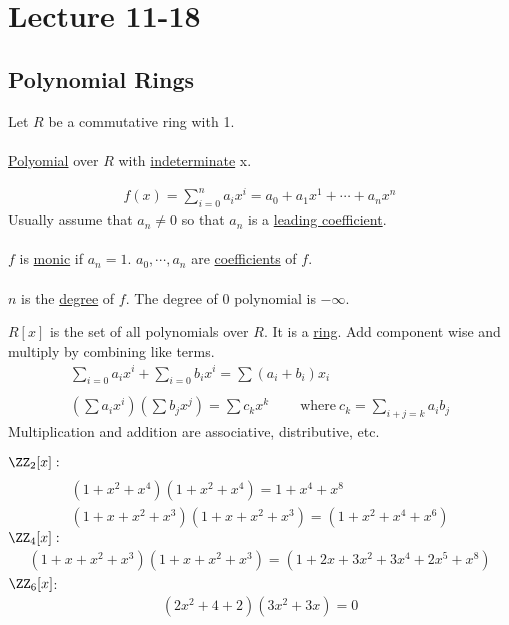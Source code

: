 \documentclass[class=scrartcl, crop=false]{standalone}
\date{2019-11-18}
\begin{document}
\section{Lecture 11-18}

\subsection{Polynomial Rings}

\begin{definition}
  Let $R$ be a commutative ring with 1. 
  \\\\
  \ul{Polyomial} over $R$ with \ul{indeterminate} x.

  \begin{gather*}
    f(x) = \sum_{i = 0}^{n}a_i x^i = a_0 + a_1 x^1 + \cdots + a_nx^n
  \end{gather*} 
  Usually assume that $a_n \neq 0$ so that $a_n$ is a \ul{leading coefficient}.
  \\\\
  $f$ is \ul{monic} if $a_n = 1$. $a_0, \cdots, a_n$ are \ul{coefficients} of $f$.
  \\\\
  $n$ is the \ul{degree} of $f$. The degree of $0$ polynomial is $-\infty$.
\end{definition} \noindent

$R[x]$ is the set of all polynomials over $R$. It is a \ul{ring}. Add component wise and multiply by combining like terms.
\begin{gather*}
  \sum_{i = 0}a_ix^i + \sum_{i = 0}b_ix^i = \sum(a_i + b_i)x_i 
  \\\\
  (\sum a_ix^i)(\sum b_j x^j) = \sum c_k x^k \qquad \ \text{where} \ c_k = \sum_{i + j = k}a_ib_j
\end{gather*} 
Multiplication and addition are associative, distributive, etc.

\begin{example}
  $\ZZ_2[x]:$
  \begin{gather*}
    \\
    (1 + x^2 + x^4)(1 + x^2 + x^4) = 1 + x^4 + x^8
    \\
    (1 + x + x^2 + x^3)(1 + x + x^2 + x^3) = (1 + x^2 + x^4 + x^6)
  \end{gather*}
  $\ZZ_4[x]:$
  \begin{gather*}
    (1 + x + x^2 + x^3)(1 + x + x^2 + x^3) = (1 + 2x + 3x^2 + 3x^4 + 2x^5 + x^8)
  \end{gather*} 
  $\ZZ_6[x]$:
  \begin{gather*}
    (2x^2 + 4 + 2)(3x^2 + 3x) = 0
  \end{gather*} 
\end{example} 
\end{document}
